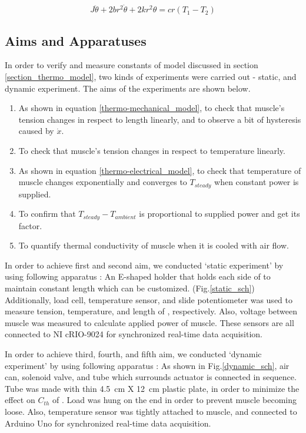 \begin{equation} \label{EqAnta}
J\ddot{\theta}+2br^2\dot{\theta}+2kr^2\theta=cr(T_1-T_2)
\end{equation}

\subsection{Aims and Apparatuses}\label{section_aimsappa}
In order to verify and measure constants of model discussed in section \ref{section_thermo_model}, two kinds of experiments were carried out - static, and dynamic experiment. The aims of the experiments are shown below.

\begin{enumerate} 
\item As shown in equation \eqref{thermo-mechanical_model}, to check that muscle's tension changes in respect to length linearly, and to observe a bit of hysteresis caused by $\dot{x}$.
\item To check that muscle's tension changes in respect to temperature linearly.
\item As shown in equation \eqref{thermo-electrical_model}, to check that temperature of muscle changes exponentially and converges to $T_{steady}$ when constant power is supplied.
\item To confirm that $T_{steady}-T_{ambient}$ is proportional to supplied power and get its factor. 
\item To quantify thermal conductivity of muscle when it is cooled with air flow.
\end{enumerate}

In order to achieve first and second aim, we conducted `static experiment' by using following apparatus : An E-shaped holder that holds each side of \scp to maintain constant length which can be customized. (Fig.\ref{static_sch}) Additionally, load cell, temperature sensor, and slide potentiometer was used to measure tension, temperature, and length of \scpnospace, respectively. Also, voltage between muscle was measured to calculate applied power of muscle. These sensors are all connected to NI cRIO-9024 for synchronized real-time data acquisition.

In order to achieve third, fourth, and fifth aim, we conducted `dynamic experiment' by using following apparatus : As shown in Fig.\ref{dynamic_sch}, air can, solenoid valve, and tube which surrounds actuator is connected in sequence. 
Tube was made with thin \SI{4.5}{\centi\meter} X \SI{12}{\centi\meter} plastic plate, in order to minimize the effect on $C_{th}$ of \scpnospace.
Load was hung on the end in order to prevent muscle becoming loose. 
Also, temperature sensor was tightly attached to muscle, and connected to Arduino Uno for synchronized real-time data acquisition.



